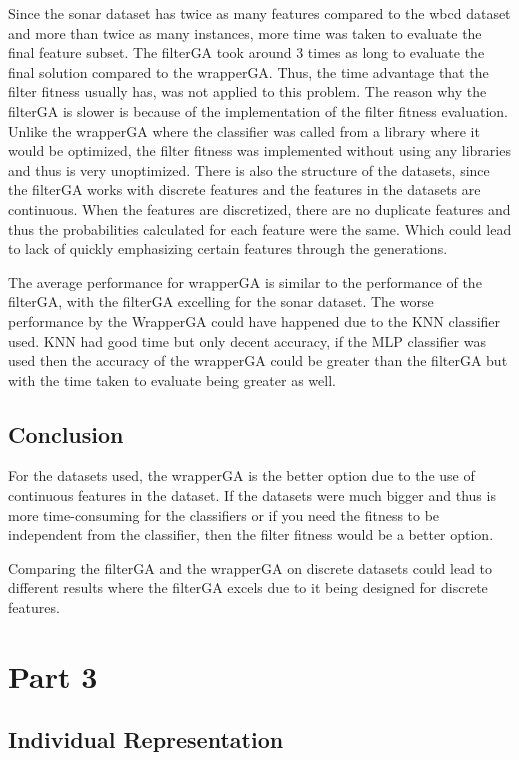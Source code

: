 \documentclass{article}
\begin{document}
Since the sonar dataset has twice as many features compared to the wbcd dataset and more than twice as many instances, more time was taken to evaluate the final feature subset. The filterGA took around 3 times as long to evaluate the final solution compared to the wrapperGA. Thus, the time advantage that the filter fitness usually has, was not applied to this problem. The reason why the filterGA is slower is because of the implementation of the filter fitness evaluation. Unlike the wrapperGA where the classifier was called from a library where it would be optimized, the filter fitness was implemented without using any libraries and thus is very unoptimized. There is also the structure of the datasets, since the filterGA works with discrete features and the features in the datasets are continuous. When the features are discretized, there are no duplicate features and thus the probabilities calculated for each feature were the same. Which could lead to lack of quickly emphasizing certain features through the generations. \par
\noindent The average performance for wrapperGA is similar to the performance of the filterGA, with the filterGA excelling for the sonar dataset. The worse performance by the WrapperGA could have happened due to the KNN classifier used. KNN had good time but only decent accuracy, if the MLP classifier was used then the accuracy of the wrapperGA could be greater than the filterGA but with the time taken to evaluate being greater as well. \par
\subsection*{Conclusion}
For the datasets used, the wrapperGA is the better option due to the use of continuous features in the dataset. If the datasets were much bigger and thus is more time-consuming for the classifiers or if you need the fitness to be independent from the classifier, then the filter fitness would be a better option. \par
\noindent Comparing the filterGA and the wrapperGA on discrete datasets could lead to different results where the filterGA excels due to it being designed for discrete features. \par
\section*{Part 3}
\subsection*{Individual Representation}
\end{document}
